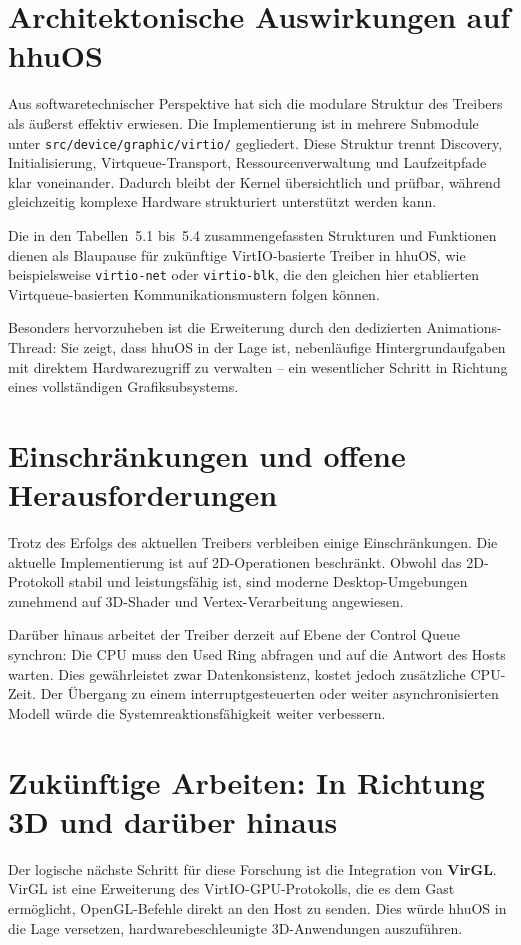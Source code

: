 \section{Architektonische Auswirkungen auf hhuOS}
Aus softwaretechnischer Perspektive hat sich die modulare Struktur des Treibers
als äußerst effektiv erwiesen. Die Implementierung ist in mehrere Submodule
unter \texttt{src/device/graphic/virtio/} gegliedert. Diese Struktur trennt
Discovery, Initialisierung, Virtqueue-Transport, Ressourcenverwaltung und
Laufzeitpfade klar voneinander. Dadurch bleibt der Kernel übersichtlich und
prüfbar, während gleichzeitig komplexe Hardware strukturiert unterstützt werden
kann.

Die in den Tabellen~5.1 bis~5.4 zusammengefassten Strukturen und Funktionen
dienen als Blaupause für zukünftige VirtIO-basierte Treiber in hhuOS, wie
beispielsweise \texttt{virtio-net} oder \texttt{virtio-blk}, die den gleichen
hier etablierten Virtqueue-basierten Kommunikationsmustern folgen können.

Besonders hervorzuheben ist die Erweiterung durch den dedizierten
Animations-Thread: Sie zeigt, dass hhuOS in der Lage ist, nebenläufige
Hintergrundaufgaben mit direktem Hardwarezugriff zu verwalten -- ein
wesentlicher Schritt in Richtung eines vollständigen Grafiksubsystems.

\section{Einschränkungen und offene Herausforderungen}
Trotz des Erfolgs des aktuellen Treibers verbleiben einige Einschränkungen. Die
aktuelle Implementierung ist auf 2D-Operationen beschränkt. Obwohl das
2D-Protokoll stabil und leistungsfähig ist, sind moderne Desktop-Umgebungen
zunehmend auf 3D-Shader und Vertex-Verarbeitung angewiesen.

Darüber hinaus arbeitet der Treiber derzeit auf Ebene der Control Queue
synchron: Die CPU muss den Used Ring abfragen und auf die Antwort des Hosts
warten. Dies gewährleistet zwar Datenkonsistenz, kostet jedoch zusätzliche
CPU-Zeit. Der Übergang zu einem interruptgesteuerten oder weiter
asynchronisierten Modell würde die Systemreaktionsfähigkeit weiter verbessern.

\section{Zukünftige Arbeiten: In Richtung 3D und darüber hinaus}
Der logische nächste Schritt für diese Forschung ist die Integration von
\textbf{VirGL}. VirGL ist eine Erweiterung des VirtIO-GPU-Protokolls, die es
dem Gast ermöglicht, OpenGL-Befehle direkt an den Host zu senden. Dies würde
hhuOS in die Lage versetzen, hardwarebeschleunigte 3D-Anwendungen
auszuführen.

